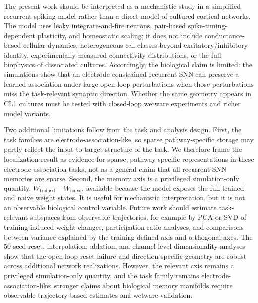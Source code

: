 \documentclass{article}
\begin{document}
The present work should be interpreted as a mechanistic study in a simplified recurrent spiking model rather than a direct model of cultured cortical networks. The model uses leaky integrate-and-fire neurons, pair-based spike-timing-dependent plasticity, and homeostatic scaling; it does not include conductance-based cellular dynamics, heterogeneous cell classes beyond excitatory/inhibitory identity, experimentally measured connectivity distributions, or the full biophysics of dissociated cultures. Accordingly, the biological claim is limited: the simulations show that an electrode-constrained recurrent SNN can preserve a learned association under large open-loop perturbations when those perturbations miss the task-relevant synaptic direction. Whether the same geometry appears in CL1 cultures must be tested with closed-loop wetware experiments and richer model variants.

Two additional limitations follow from the task and analysis design. First, the task families are electrode-association-like, so sparse pathway-specific storage may partly reflect the input-to-target structure of the task. We therefore frame the localization result as evidence for sparse, pathway-specific representations in these electrode-association tasks, not as a general claim that all recurrent SNN memories are sparse. Second, the memory axis is a privileged simulation-only quantity, $W_{\mathrm{trained}} - W_{\mathrm{naive}}$, available because the model exposes the full trained and naive weight states. It is useful for mechanistic interpretation, but it is not an observable biological control variable. Future work should estimate task-relevant subspaces from observable trajectories, for example by PCA or SVD of training-induced weight changes, participation-ratio analyses, and comparisons between variance explained by the training-defined axis and orthogonal axes. The 50-seed reset, interpolation, ablation, and channel-level dimensionality analyses show that the open-loop reset failure and direction-specific geometry are robust across additional network realizations. However, the relevant axis remains a privileged simulation-only quantity, and the task family remains electrode-association-like; stronger claims about biological memory manifolds require observable trajectory-based estimates and wetware validation.
\end{document}
